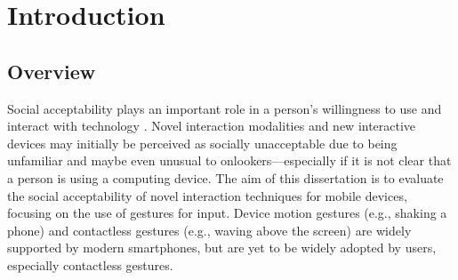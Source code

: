 \documentclass{l4proj}
\begin{document}
\tableofcontents
%
%
%
%
%
% 
%
%
\chapter{Introduction}



\section{Overview}
Social acceptability plays an important role in a person's willingness to use and interact with technology \citep{rico_usable_2010}. Novel interaction modalities and new interactive devices may initially be perceived as socially unacceptable due to being unfamiliar and maybe even unusual to onlookers---especially if it is not clear that a person is using a computing device. The aim of this dissertation is to evaluate the social acceptability of novel interaction techniques for mobile devices, focusing on the use of gestures for input. Device motion gestures (e.g., shaking a phone) and contactless gestures (e.g., waving above the screen) are widely supported by modern smartphones, but are yet to be widely adopted by users, especially contactless gestures.
\end{document}
